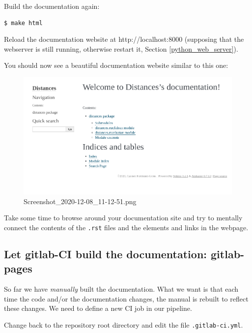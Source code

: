 \documentclass[11pt]{article}
\begin{document}
Build the documentation again:

\begin{verbatim}
$ make html
\end{verbatim}

Reload the documentation website at http://localhost:8000 (supposing
that the webserver is still running, otherwise restart it,
Section \ref{python_web_server}).

You should now see a beautiful documentation website similar to this
one:

\begin{figure}
\centering
\includegraphics{static/docs.png}
\caption{Screenshot\_2020-12-08\_11-12-51.png}
\end{figure}

Take some time to browse around your documentation site and try to
mentally connect the contents of the \texttt{.rst} files and the
elements and links in the webpage.

    \hypertarget{let-gitlab-ci-build-the-documentation-gitlab-pages}{%
\subsection{Let gitlab-CI build the documentation:
gitlab-pages}\label{let-gitlab-ci-build-the-documentation-gitlab-pages}}

So far we have \emph{manually} built the documentation. What we want is
that each time the code and/or the documentation changes, the manual is
rebuilt to reflect these changes. We need to define a new CI job in our
pipeline.

Change back to the repository root directory and edit the file
\texttt{.gitlab-ci.yml}.
\end{document}
